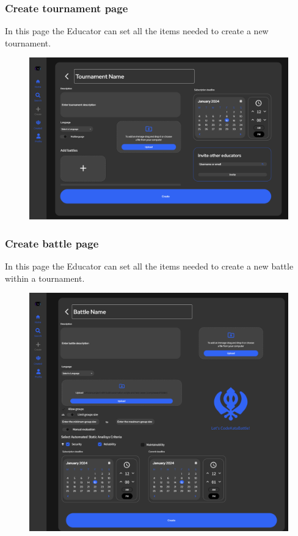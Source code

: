 \documentclass[12pt, a4paper]{report}
\begin{document}
    \subsubsection{Create tournament page} 
    In this page the Educator can set all the items needed to create a new tournament. 
    \begin{figure}[H]
        \centering
        \includegraphics[width=0.8\linewidth]{images/create_tournament.png}
    \end{figure}

    \subsubsection{Create battle page} 
    In this page the Educator can set all the items needed to create a new battle within a tournament. 
    \begin{figure}[H]
        \centering
        \includegraphics[width=0.75\linewidth]{images/create_battle.png}
    \end{figure}
\end{document}
